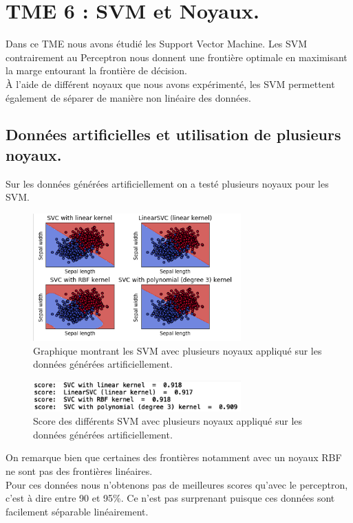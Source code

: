 \documentclass{article}
\begin{document}
\section{TME 6 : SVM et Noyaux.}
Dans ce TME nous avons étudié les Support Vector Machine. Les SVM contrairement au Perceptron nous donnent une frontière optimale en maximisant la marge entourant la frontière de décision.\\À l'aide de différent noyaux que nous avons expérimenté, les SVM permettent également de séparer de manière non linéaire des données.\\
\subsection{Données artificielles et utilisation de plusieurs noyaux.}
Sur les données générées artificiellement on a testé plusieurs noyaux pour les SVM.
\begin{figure}[h]
	\center
	\includegraphics[width=8cm]{figure/tme6/svmarti.png} 
	 \caption{Graphique montrant les SVM avec plusieurs noyaux appliqué sur les données générées artificiellement.  }
	 
\end{figure}
\begin{figure}[h]
	\center
	\includegraphics[width=8cm]{figure/tme6/score.png} 
	 \caption{Score des différents SVM avec plusieurs noyaux appliqué sur les données générées artificiellement. }
	 
\end{figure}
On remarque bien que certaines des frontières notamment avec un noyaux RBF ne sont pas des frontières linéaires.\\
Pour ces données nous n'obtenons pas de meilleures scores qu'avec le perceptron, c'est à dire entre 90 et 95\%. Ce n'est pas surprenant puisque ces données sont facilement séparable linéairement.
\clearpage
\end{document}
